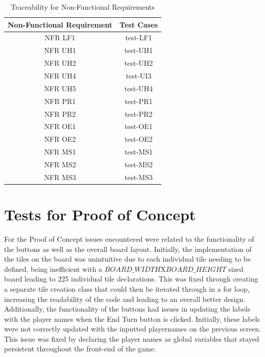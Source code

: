\documentclass[12pt, titlepage]{article}
\begin{document}
\begin{table}[H]
  \begin{center}
    \caption{Traceability for Non-Functional Requirements}
    \label{tab:table1}
    \begin{tabular}{c|c} 
        \toprule
        \textbf{Non-Functional Requirement} & \textbf{Test Cases}\\
        \midrule
        NFR LF1 & test-LF1 \\
        \hline
        NFR UH1 & test-UH1\\
        \hline
        NFR UH2 & test-UH2\\
        \hline
        NFR UH4 & test-UI3\\
        \hline
        NFR UH5 & test-UH4\\
        \hline
        NFR PR1 & test-PR1\\
        \hline
        NFR PR2 & test-PR2\\
        \hline
        NFR OE1 & test-OE1 \\
        \hline
        NFR OE2 & test-OE2 \\
        \hline
        NFR MS1 & test-MS1\\
        \hline
        NFR MS2 & test-MS2\\
        \hline
        NFR MS3 & test-MS3 \\
        \bottomrule
    \end{tabular}
  \end{center}
\end{table}

\section{Tests for Proof of Concept}%
For the Proof of Concept issues encountered were related to the functionality of the buttons as well as the overall board layout. Initially, the implementation of the tiles on the board was unintuitive due to each individual tile needing to be defined, being inefficient with a $BOARD\_WIDTH$X$BOARD\_HEIGHT$ sized board leading to 225 individual tile declarations. This was fixed through creating a separate tile creation class that could then be iterated through in a for loop, increasing the readability of the code and leading to an overall better design.\\
Additionally, the functionality of the buttons had issues in updating the labels with the player names when the End Turn button is clicked. Initially, these labels were not correctly updated with the inputted playernames on the previous screen. This issue was fixed by declaring the player names as global variables that stayed persistent throughout the front-end of the game. 
	
\end{document}
